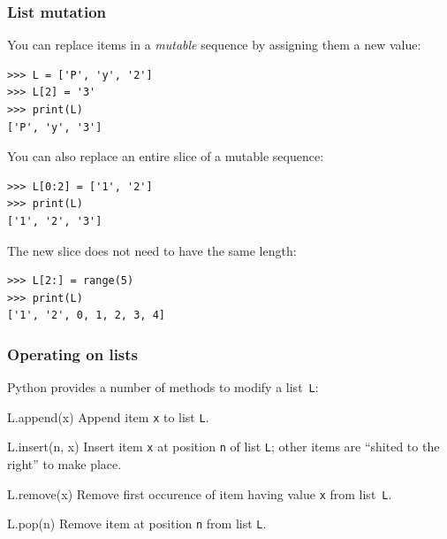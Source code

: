 \documentclass[english,serif,mathserif,xcolor=pdftex,dvipsnames,table]{beamer}
\begin{document}
\begin{frame}[fragile]
  \frametitle{List mutation}
  You can replace items in a \emph{mutable} sequence by assigning them
  a new value:
\begin{lstlisting}
>>> L = ['P', 'y', '2']
>>> L[2] = '3'
>>> print(L)
['P', 'y', '3']
\end{lstlisting}

\pause
You can also replace an entire slice of a mutable sequence:
\begin{lstlisting}
>>> L[0:2] = ['1', '2']
>>> print(L)
['1', '2', '3']
\end{lstlisting}

\pause
The new slice does not need to have the same length:
\begin{lstlisting}
>>> L[2:] = range(5)
>>> print(L)
['1', '2', 0, 1, 2, 3, 4]
\end{lstlisting}
\end{frame}


\begin{frame}[fragile]
  \frametitle{Operating on lists}

  Python provides a number of methods to modify a list~\texttt{L}:

  \begin{describe}{L.append(x)}
    Append item \texttt{x} to list \texttt{L}.
  \end{describe}

  \begin{describe}{L.insert(n, x)}
    Insert item \texttt{x} at position \texttt{n} of list \texttt{L};
    other items are ``shited to the right'' to make place.
  \end{describe}

  \begin{describe}{L.remove(x)}
    Remove first occurence of item having value \texttt{x} from list~\texttt{L}.
  \end{describe}

  \begin{describe}{L.pop(n)}
    Remove item at position \texttt{n} from list \texttt{L}.
  \end{describe}
\end{frame}
\end{document}
